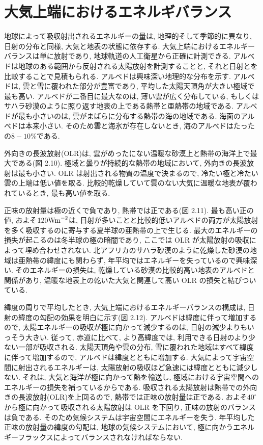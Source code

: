 \documentclass[a4j,12pt,openbib,oneside,dvipdfmx]{jbook}
\begin{document}
\newpage
{}
\section{大気上端におけるエネルギバランス}
地球によって吸収射出されるエネルギーの量は, 地理的そして季節的に異なり, 日射の分布と同様, 大気と地表の状態に依存する.
大気上端におけるエネルギーバランスは単に放射であり, 地球軌道の人工衛星から正確に計測できる.
アルベドは地球のある範囲から反射される太陽放射を計測することと, それと日射とを比較することで見積もられる.
アルベドは興味深い地理的な分布を示す. 
アルベドは, 雲と雪に覆われた部分が豊富であり, 平均した太陽天頂角が大きい極域で最も高い.
アルベドが二番目に最大なのは, 薄い雲が広く分布している, もしくはサハラ砂漠のように照り返す地表の上である熱帯と亜熱帯の地域である.
アルベドが最も小さいのは, 雲がまばらに分布する熱帯の海の地域である.
海面のアルベドは本来小さい. そのため雲と海氷が存在しないとき, 海のアルベドはたったの$8-10\%$である.
\par
外向きの長波放射(OLR)は, 雲がめったにない温暖な砂漠上と熱帯の海洋上で最大である(図 2.10).
極域と曇りが持続的な熱帯の地域において, 外向きの長波放射は最も小さい.
OLR は射出される物質の温度で決まるので, 冷たい極と冷たい雲の上端は低い値を取る.
比較的乾燥していて雲のない大気に温暖な地表が覆われているとき, 最も高い値を取る.
\par
正味の放射量は極の近くで負であり, 熱帯では正である(図 2.11).
最も高い正の値, およそ$120\rm{Wm}^{-2}$は, 日射が多いことと比較的低いアルベドの両方が太陽放射を多く吸収するのに寄与する夏半球の亜熱帯の上で生じる.
最大のエネルギーの損失が起こるのは冬半球の極の暗闇であり, ここでは OLR が太陽放射の吸収によって埋め合わせされない.
北アフリカのサハラ砂漠のように乾燥した砂漠の地域は亜熱帯の緯度にも関わらず, 年平均ではエネルギーを失っているので興味深い.
そのエネルギーの損失は, 乾燥している砂漠の比較的高い地表のアルベドと関係があり, 温暖な地表上の乾いた大気と関連して高い OLR の損失と結びついている.
\par
緯度の周りで平均したとき, 大気上端におけるエネルギーバランスの構成は, 日射の緯度の勾配の効果を明白に示す(図 2.12).
アルベドは緯度に伴って増加するので, 太陽エネルギーの吸収が極に向かって減少するのは, 日射の減少よりもいっそう大きい.
従って, 赤道に比べて, より高緯度では, 利用できる日射のより少ない一部が吸収される.
太陽天頂角や雲の分布, 雪に覆われた地域はすべて緯度に伴って増加するので, アルベドは緯度とともに増加する.
大気によって宇宙空間に射出されるエネルギーは, 太陽放射の吸収ほど急速には緯度とともに減少しない.
それは, 大気と海洋が極に向かって熱を輸送し, 極域における宇宙空間へのエネルギーの損失を補っているからである.
吸収される太陽放射は熱帯での外向きの長波放射(OLR)を上回るので, 熱帯では正味の放射量は正である.
およそ$40^\circ$から極に向かって吸収される太陽放射は OLR を下回り, 正味の放射のバランスは負である.
そのため気候システムは宇宙空間にエネルギーを失う.
年平均した正味の放射量の緯度の勾配は, 地球の気候システムにおいて, 極に向かうエネルギーフラックスによってバランスされなければならない.
\end{document}
